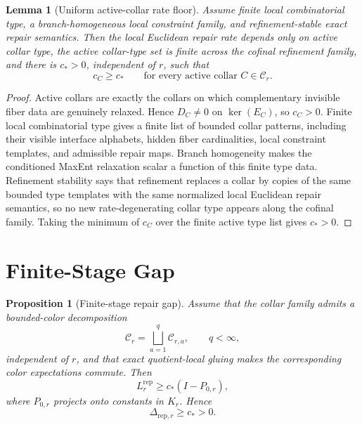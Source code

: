 \documentclass[11pt]{article}
\numberwithin{equation}{section}
\newtheorem{proposition}[theorem]{Proposition}
\newtheorem{lemma}[theorem]{Lemma}
\theoremstyle{remark}
\newcommand{\Rep}{\mathrm{rep}}
\begin{document}
\begin{lemma}[Uniform active-collar rate floor]
\label{lem:floor}
Assume finite local combinatorial type, a branch-homogeneous local constraint family, and
refinement-stable exact repair semantics. Then the local Euclidean repair rate depends only on
active collar type, the active collar-type set is finite across the cofinal refinement family, and
there is \(c_*>0\), independent of \(r\), such that
\[
c_C\ge c_*
\qquad
\text{for every active collar }C\in\mathcal C_r.
\tag{3}
\]
\end{lemma}

\begin{proof}
Active collars are exactly the collars on which complementary invisible fiber data are genuinely
relaxed. Hence \(D_C\neq0\) on \(\ker(E_C)\), so \(c_C>0\). Finite local combinatorial type gives
a finite list of bounded collar patterns, including their visible interface alphabets, hidden
fiber cardinalities, local constraint templates, and admissible repair maps. Branch homogeneity
makes the conditioned MaxEnt relaxation scalar a function of this finite type data. Refinement
stability says that refinement replaces a collar by copies of the same bounded type templates
with the same normalized local Euclidean repair semantics, so no new rate-degenerating collar
type appears along the cofinal family. Taking the minimum of \(c_C\) over the finite active type
list gives \(c_*>0\).
\end{proof}

\section{Finite-Stage Gap}

\begin{proposition}[Finite-stage repair gap]
\label{prop:finite-gap}
Assume that the collar family admits a bounded-color decomposition
\[
\mathcal C_r=\bigsqcup_{a=1}^{q}\mathcal C_{r,a},
\qquad q<\infty,
\tag{4}
\]
independent of \(r\), and that exact quotient-local gluing makes the corresponding color
expectations commute. Then
\[
L_r^{\Rep}\ge c_*(I-P_{0,r}),
\tag{5}
\]
where \(P_{0,r}\) projects onto constants in \(K_r\). Hence
\[
\Delta_{\mathrm{rep},r}\ge c_*>0.
\tag{6}
\]
\end{proposition}
\end{document}
